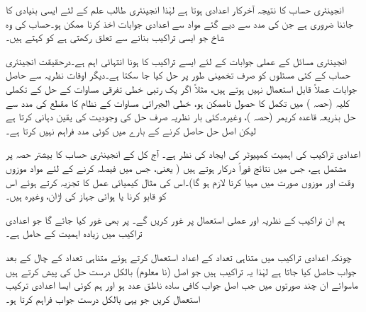 انجینئری حساب کا نتیجہ آخرکار اعدادی ہوتا ہے لہٰذا انجینئری طالب علم  کے لئے ایسی بنیادی  کا جاننا ضروری ہے جن کی مدد سے دیے گئے مواد سے اعدادی جوابات اخذ کرنا ممکن ہو۔حساب کی وہ شاخ جو  ایسی تراکیب بنانے سے تعلق رکھتی ہے کو  کہتے ہیں۔ 

انجینئری مسائل کے عملی جوابات کے لئے ایسے تراکیب کا ہونا انتہائی اہم ہے۔درحقیقت انجینئری حساب کے کئی مسئلوں کو صرف تخمینی طور پر حل کیا جا سکتا ہے۔دیگر اوقات نظریہ سے حاصل جوابات عملاً قابل استعمال نہیں ہوتے ہیں، مثلاً اگر یک رتبی خطی تفرقی مساوات کے حل کے تکملی کلیہ (حصہ ) میں تکمل کا حصول ناممکن ہو، خطی الجبرائی مساوات کے نظام کا مقطع کی مدد سے حل بذریعہ قاعدہ کریمر (حصہ )، وغیرہ۔کئی بار نظریہ صرف حل کی وجودیت کی یقین دہانی کرتا ہے لیکن اصل حل حاصل کرنے کے بارے میں کوئی مدد فراہم نہیں کرتا ہے۔

اعدادی تراکیب کی اہمیت کمپیوٹر کی ایجاد کی نظر ہے۔ آج کل کے انجینئری حساب کا بیشتر حصہ  پر مشتمل ہے، جس میں نتائج فوراً درکار ہوتے ہیں ( یعنی، جس میں فیصلہ کرنے کے لئے مواد موزوں وقت اور موزوں صورت میں مہیا کرنا  لازم ہو گا)۔اس کی مثال کیمیائی عمل کا تجزیہ کرتے ہوئے اس کو قابو کرنا یا ہوائی جہاز کی اڑان، وغیرہ ہیں۔  

ہم ان تراکیب کے نظریہ اور عملی استعمال پر غور کریں گے۔ پر بھی غور کیا جائے گا جو اعدادی تراکیب میں زیادہ اہمیت کے حامل ہے۔     

چونکہ اعدادی تراکیب میں متناہی تعداد کے اعداد استعمال کرتے ہوئے متناہی تعداد کے چال کے بعد جواب حاصل کیا جاتا ہے لہٰذا  یہ تراکیب   ہیں جو اصل (نا معلوم) بالکل درست حل کی  پیش کرتے ہیں ماسوائے ان چند صورتوں میں جب اصل جواب کافی سادہ ناطق عدد ہو اور ہم کوئی ایسا اعدادی ترکیب استعمال کریں جو یہی بالکل درست جواب فراہم کرتا ہو۔

